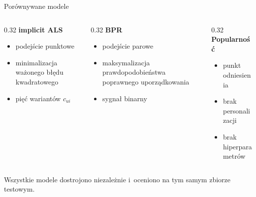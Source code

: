 \documentclass[aspectratio=169,11pt]{beamer}
\begin{document}
\begin{frame}{Porównywane modele}

  \begin{columns}[t]
    \begin{column}{0.32\textwidth}
      \textbf{implicit ALS}
      \begin{itemize}
        \item podejście punktowe
        \item minimalizacja ważonego błędu kwadratowego
        \item pięć wariantów $c_{ui}$
      \end{itemize}
    \end{column}
    \begin{column}{0.32\textwidth}
      \textbf{BPR}
      \begin{itemize}
        \item podejście parowe
        \item maksymalizacja prawdopodobieństwa poprawnego uporządkowania
        \item sygnał binarny
      \end{itemize}
    \end{column}
    \begin{column}{0.32\textwidth}
      \textbf{Popularność}
      \begin{itemize}
        \item punkt odniesienia
        \item brak personalizacji
        \item brak hiperparametrów
      \end{itemize}
    \end{column}
  \end{columns}

  \vspace{1.5em}
  \begin{center}
    \small Wszystkie modele dostrojono niezależnie i~oceniono na tym samym zbiorze testowym.
  \end{center}

\end{frame}

\end{document}
